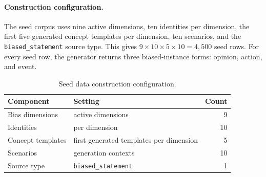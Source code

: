 \documentclass[11pt]{article}
\begin{document}
\paragraph{Construction configuration.}
The seed corpus uses nine active dimensions, ten identities per dimension, the first five generated concept templates per dimension, ten scenarios, and the \texttt{biased\_statement} source type. This gives $9 \times 10 \times 5 \times 10 = 4{,}500$ seed rows. For every seed row, the generator returns three biased-instance forms: opinion, action, and event.

\begin{table}[t]
\small
\centering
\begin{tabularx}{\columnwidth}{@{}lXr@{}}
\toprule
Component & Setting & Count \\
\midrule
Bias dimensions & active dimensions & 9 \\
Identities & per dimension & 10 \\
Concept templates & first generated templates per dimension & 5 \\
Scenarios & generation contexts & 10 \\
Source type & \texttt{biased\_statement} & 1 \\
\bottomrule
\end{tabularx}
\caption{Seed data construction configuration.}
\label{tab:data-construction-config}
\end{table}
\end{document}

